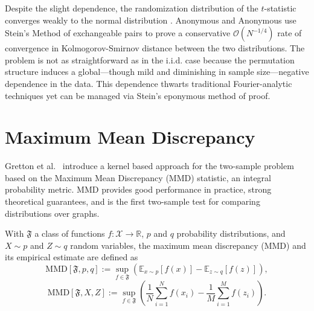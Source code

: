 Despite the slight dependence, the randomization distribution of the
$t$-statistic converges weakly to the normal distribution
\cite{lehmann1999elements}.  Anonymous and Anonymous \cite{rayholmes2012} use
Stein's Method of exchangeable pairs \cite{chen2010normal,
  stein1986approximate} to prove a conservative
$\mathcal{O}(N^{-1/4})$ rate of convergence in Kolmogorov-Smirnov
distance between the two distributions.  The problem is not as
straightforward as in the i.i.d. case because the permutation
structure induces a global---though mild and diminishing in sample
size---negative dependence in the data.  This dependence thwarts
traditional Fourier-analytic techniques yet can be managed via Stein's
eponymous method of proof.  

\section{Maximum Mean Discrepancy}

Gretton et al.\ \cite{gretton19m, gretton2010fast, gretton2012kernel,
  borgwardt2006integrating} introduce a kernel based approach for
the two-sample problem based on the Maximum Mean Discrepancy (MMD)
statistic, an integral probability metric.  MMD provides good
performance in practice, strong theoretical guarantees, and is the
first two-sample test for comparing distributions over graphs.

\begin{definition}
  With $\mathfrak{F}$ a class of functions $f:\mathcal{X} \to
  \mathbb{R}$, $p$ and $q$ probability distributions, and $X \sim p$
  and $Z \sim q$ random variables, the maximum mean discrepancy (MMD)
  and its empirical estimate are defined as 
  \begin{equation*}
    \text{MMD}[\mathfrak{F},p,q] := \sup_{f\in
      \mathfrak{F}}(\mathbb{E}_{x\sim p}[f(x)] - \mathbb{E}_{z\sim q}[f(z)]),
  \end{equation*}
  \begin{equation*}
    \text{MMD}[\mathfrak{F},X,Z] := \sup_{f\in
      \mathfrak{F}}\left (\frac{1}{N}\sum_{i=1}^Nf(x_i) -
    \frac{1}{M}\sum_{i=1}^M f(z_i) \right ).
  \end{equation*}
\end{definition}

